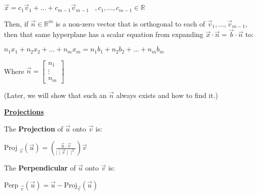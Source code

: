 \documentclass{letter}
\newcommand{\0}[1]{\begin{bmatrix}#1\end{bmatrix}}
\newcommand{\h}[1]{\underline{\textbf{#1}}}
\begin{document}
		$\vec x = c_1\vec v_1 + \dots + c_{m-1}\vec v_{m-1}\;\;\;, c_1, \dots, c_{m-1} \in \mathbb{R}$
		
		Then, if $\vec n \in \mathbb{R}^m$ is a non-zero vector that is orthogonal to each of $\vec v_1, \dots, \vec v_{m-1}$, then that same hyperplane has a scalar equation from expanding $\vec x \cdot \vec n = \vec b \cdot \vec n$ to:
		
		$n_1x_1 + n_2x_2 + \dots + n_mx_m = n_1b_1 + n_2b_2 + \dots + n_mb_m$
		
		Where $\displaystyle \vec n = \0{n_1\\\vdots\\n_m}$
		
		(Later, we will show that such an $\vec n$ always exists and how to find it.)
		
		\h{Projections}
		
		The \textbf{Projection} of $\vec u$ onto $\vec v$ is:
		
		Proj$\;_{\vec v} (\vec u) = \left( \frac{\vec u \cdot \vec v}{\mid\mid\vec v\mid\mid^2}\right)\vec v$
		
		The \textbf{Perpendicular} of $\vec u$ onto $\vec v$ is:
		
		Perp$\;_{\vec v}(\vec u) = \vec u - \text{Proj}_{\vec v}(\vec u)$
\end{document}
